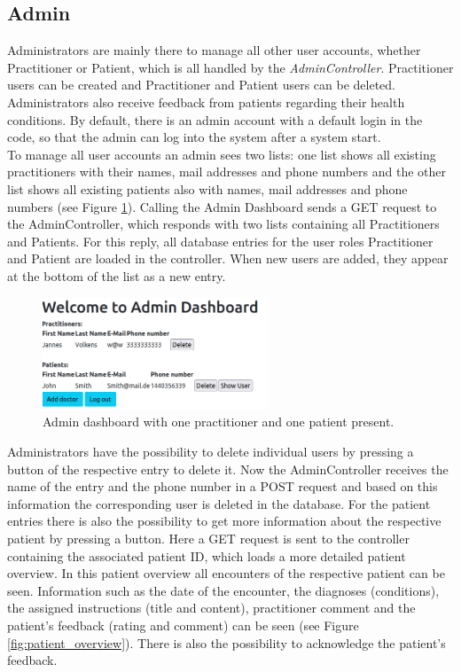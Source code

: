 \documentclass[]{report}
\begin{document}
\subsection{Admin}
Administrators are mainly there to manage all other user accounts, whether Practitioner or Patient, which is all handled by the \textit{AdminController}. Practitioner users can be created and Practitioner and Patient users can be deleted. Administrators also receive feedback from patients regarding their health conditions. By default, there is an admin account with a default login in the code, so that the admin can log into the system after a system start.\\
To manage all user accounts an admin sees two lists: one list shows all existing practitioners with their names, mail addresses and phone numbers and the other list shows all existing patients also with names, mail addresses and phone numbers (see Figure \ref{fig:admin_dashboard}). Calling the Admin Dashboard sends a GET request to the AdminController, which responds with two lists containing all Practitioners and Patients. For this reply, all database entries for the user roles Practitioner and Patient are loaded in the controller. When new users are added, they appear at the bottom of the list as a new entry.\\
\begin{figure}[h]
    \centering
    \includegraphics[width=0.6\textwidth]{Admin_Dashboard.png}
    \caption{Admin dashboard with one practitioner and one patient present.}
    \label{fig:admin_dashboard}
\end{figure}
Administrators have the possibility to delete individual users by pressing a button of the respective entry to delete it. Now the AdminController receives the name of the entry and the phone number in a POST request and based on this information the corresponding user is deleted in the database. For the patient entries there is also the possibility to get more information about the respective patient by pressing a button. Here a GET request is sent to the controller containing the associated patient ID, which loads a more detailed patient overview. In this patient overview all encounters of the respective patient can be seen. Information such as the date of the encounter, the diagnoses (conditions), the assigned instructions (title and content), practitioner comment and the patient's feedback (rating and comment) can be seen (see Figure \ref{fig:patient_overview}). There is also the possibility to acknowledge the patient's feedback.\\
\end{document}

